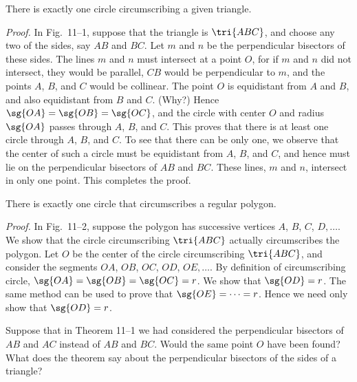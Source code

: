 \documentclass[11pt]{book}
\theoremstyle{bkplain}
\theoremstyle{XIplainnote}
\theoremstyle{bkplain}
\theoremstyle{bkplain}
\begin{document}
\begin{theorem}
There is exactly one circle circumscribing a given triangle.
\end{theorem}

\noindent\emph{Proof.} In Fig.~11--1, suppose that the triangle is
$\tri{ABC}$, and choose any two of the sides, say $AB$ and $BC$. Let $m$ and
$n$ be the perpendicular bisectors of these sides. The lines $m$ and $n$ must
intersect at a point $O$, for if $m$ and $n$ did not intersect, they would be
parallel, $CB$ would be perpendicular to $m$, and the points $A$, $B$, and $C$
would be collinear. The point $O$ is equidistant from $A$ and $B$, and also
equidistant from $B$ and $C$. (Why?) Hence $\sg{OA} = \sg{OB} = \sg{OC}$, and
the circle with center $O$ and radius $\sg{OA}$ passes through $A$, $B$, and
$C$. This proves that there is at least one circle through $A$, $B$, and $C$.
To see that there can be only one, we observe that the center of such a circle
must be equidistant from $A$, $B$, and $C$, and hence must lie on the
perpendicular bisectors of $AB$ and $BC$. These lines, $m$ and $n$, intersect
in only one point. This completes the proof.

\FIGXIONETWO

\begin{theorem}
There is exactly one circle that circumscribes a regular polygon.
\end{theorem}

\noindent\emph{Proof.} In Fig.~11--2, suppose the polygon has successive
vertices $A$, $B$, $C$, $D,\ldots$. We show that the circle circumscribing
$\tri{ABC}$ actually circumscribes the polygon. Let $O$ be the center of the
circle circumscribing $\tri{ABC}$, and consider the segments $OA$, $OB$, $OC$,
$OD$, $OE,\ldots$. By definition of circumscribing circle,
$\sg{OA} = \sg{OB} = \sg{OC} = r$. We show that $\sg{OD} = r$. The same method
can be used to prove that $\sg{OE} = \cdots = r$. Hence we need only show that
$\sg{OD} = r$.

\begin{steps}
\end{steps}

Suppose that in Theorem 11--1 we had considered the perpendicular bisectors of
$AB$ and $AC$ instead of $AB$ and $BC$. Would the same point $O$ have been
found? What does the theorem say about the perpendicular bisectors of the
sides of a triangle?
\end{document}
